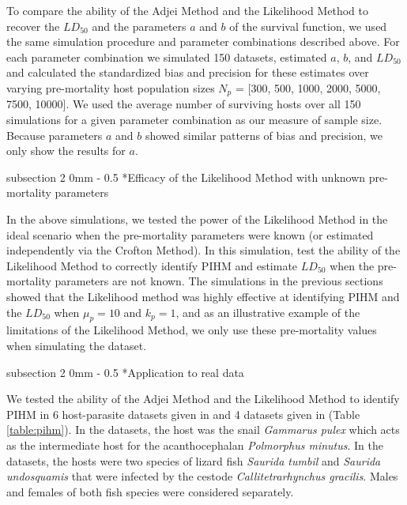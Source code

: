 \documentclass[12pt, a4paper]{article}
\makeatletter
\renewcommand{\subsection}{\@startsection
{subsection}%
{2}%
{0mm}%
{-\baselineskip}%
{0.5\baselineskip}%
{\normalfont\bf}} %
\makeatother
\begin{document}
To compare the ability of the Adjei Method and the Likelihood Method to recover the $LD_{50}$ and the parameters $a$ and $b$ of the survival function, we used the same simulation procedure and parameter combinations described above. For each parameter
combination we simulated 150 datasets, estimated $a$, $b$, and $LD_{50}$ and calculated the standardized bias and
precision \citep{Walther2005} for these estimates over varying pre-mortality host population sizes  $N_p$ = [300, 500, 1000, 2000, 5000, 7500,
10000]. We used the average number of surviving hosts over all 150 simulations for a given parameter combination as our measure of sample size.  Because parameters $a$ and $b$ showed similar patterns of bias and precision, we only show the results for $a$.

\subsection*{Efficacy of the Likelihood Method with unknown pre-mortality parameters}

In the above simulations, we tested the power of the Likelihood Method in the ideal scenario when the pre-mortality parameters were known (or estimated independently via the Crofton Method).  In this simulation, test the ability of the Likelihood Method to correctly identify PIHM and estimate $LD_50$ when the pre-mortality parameters are not known. The simulations in the previous sections showed that the Likelihood method was highly effective at identifying PIHM and the $LD_{50}$ when $\mu_p = 10$ and $k_p = 1$, and as an illustrative example of the limitations of the Likelihood Method, we only use these pre-mortality values when simulating the dataset.

\subsection*{Application to real data}

We tested the ability of the Adjei Method and the Likelihood Method to identify
PIHM in 6 host-parasite datasets given in \cite{Crofton1971a} and 4 datasets
given in \cite{Adjei1986} (Table \ref{table:pihm}). In the \cite{Crofton1971a} datasets, the host was
the snail \emph{Gammarus pulex} which acts as the intermediate host for the
acanthocephalan \emph{Polmorphus minutus}. In the \cite{Adjei1986} datasets,
the hosts were two species of lizard fish \emph{Saurida tumbil} and
\emph{Saurida undosquamis} that were infected by the cestode
\emph{Callitetrarhynchus gracilis}.  Males and females of both fish species
were considered separately.
\end{document}
